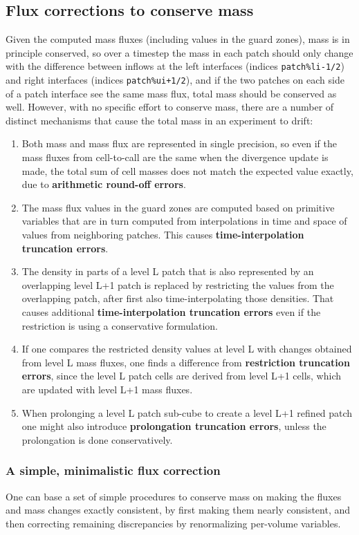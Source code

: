 \documentclass[paper=a4,fontsize=11pt]{scrartcl}
\numberwithin{equation}{section}		%
\numberwithin{figure}{section}			%
\numberwithin{table}{section}				%
\begin{document}
\subsection{Flux corrections to conserve mass}
Given the computed mass fluxes (including values in the guard zones), mass is in principle conserved, so over a timestep the mass in each patch should only change with the difference between inflows at the left interfaces (indices \verb|patch%li-1/2|) and right interfaces (indices \verb|patch%ui+1/2|), and if the two patches on each side of a patch interface see the same mass flux, total mass should be conserved as well. However, with no specific effort to conserve mass, there are a number of distinct mechanisms that cause the total mass in an experiment to drift:
\begin{enumerate}
    \item Both mass and mass flux are represented in single precision, so even if the mass fluxes from cell-to-call are the same when the divergence update is made, the total sum of cell masses does not match the expected value exactly, due to \textbf{arithmetic round-off errors}.
    \item The mass flux values in the guard zones are computed based on primitive variables that are in turn computed from interpolations in time and space of values from neighboring patches.  This causes \textbf{time-interpolation truncation errors}.
    \item The density in parts of a level L patch that is also represented by an overlapping level L+1 patch is replaced by restricting the values from the overlapping patch, after first also time-interpolating those densities.  That causes additional \textbf{time-interpolation truncation errors} even if the restriction is using a conservative formulation.
    \item If one compares the restricted density values at level L with changes obtained from level L mass fluxes, one finds a difference from \textbf{restriction truncation errors}, since the level L patch cells are derived from level L+1 cells, which are updated with level L+1 mass fluxes.
    \item When prolonging a level L patch sub-cube to create a level L+1 refined patch one might also introduce \textbf{prolongation truncation errors}, unless the prolongation is done conservatively.
\end{enumerate}

\subsubsection{A simple, minimalistic flux correction}
One can base a set of simple procedures to conserve mass on making the fluxes and mass changes exactly consistent, by first making them nearly consistent, and then correcting remaining discrepancies by renormalizing per-volume variables.
\end{document}
